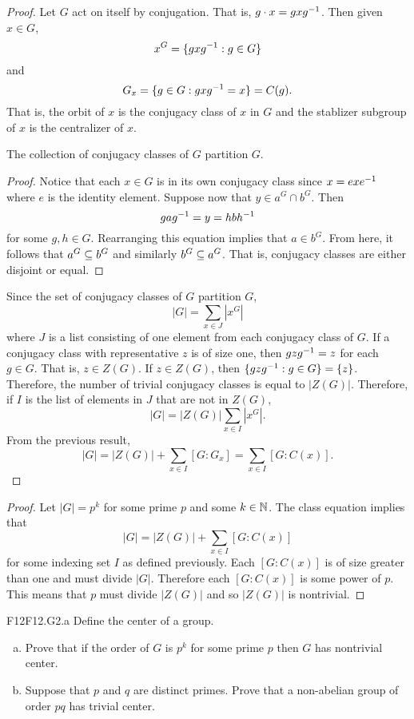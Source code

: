 \documentclass[../../AlgebraQualSolutions.tex]{subfiles}
\begin{document}
\begin{proof}
    Let $G$ act on itself by conjugation. That is, $g\cdot x = gxg^{-1}$. Then given $x \in G$,
        \[x^G = \{gxg^{-1}: g \in G\}\]
    and
        \[G_x = \{g \in G: gxg^{-1} = x\} = C(g).\]
    That is, the orbit of $x$ is the conjugacy class of $x$ in $G$ and the stablizer subgroup of $x$ is the centralizer of $x$.
    \begin{claim}
        The collection of conjugacy classes of $G$ partition $G$.

        \begin{proof}
            Notice that each $x \in G$ is in its own conjugacy class since $x = exe^{-1}$ where $e$ is the identity element. Suppose now that $y \in a^G \cap b^G$. Then
                \[gag^{-1} = y = hbh^{-1}\]
            for some $g,h \in G$. Rearranging this equation implies that $a \in b^G$. From here, it follows that $a^G \subseteq b^G$ and similarly $b^G \subseteq a^G$. That is, conjugacy classes are either disjoint or equal.
        \end{proof}
    \end{claim}

    Since the set of conjugacy classes of $G$ partition $G$,
        \[|G| = \sum_{x \in J} |x^G|\]
    where $J$ is a list consisting of one element from each conjugacy class of $G$. If a conjugacy class with representative $z$ is of size one, then
    $gzg^{-1} = z$ for each $g \in G$. That is, $z \in Z(G)$. If $z \in Z(G)$, then $\{gzg^{-1}: g \in G\} = \{z\}$. Therefore, the number of trivial conjugacy classes is equal to $|Z(G)|$. Therefore, if $I$ is the list of elements in $J$ that are not in $Z(G)$,
        \[|G| = |Z(G)| \sum_{x \in I} |x^G|.\]
    From the previous result,
        \[|G| = |Z(G)| + \sum_{x \in I} [G:G_x] = \sum_{x \in I}[G:C(x)].\]
\end{proof}

\begin{proof}
    Let $|G| = p^k$ for some prime $p$ and some $k \in \mathbb{N}$. The class equation implies that
        \[|G| = |Z(G)| + \sum_{x \in I}[G:C(x)]\]
    for some indexing set $I$ as defined previously. Each $[G:C(x)]$ is of size greater than one and must divide $|G|$. Therefore each $[G:C(x)]$ is some power of $p$. This means that $p$ must divide $|Z(G)|$ and so $|Z(G)|$ is nontrivial.
\end{proof}

\begin{prob}{F12}{F12.G2.a}
    Define the center of a group.
    \begin{enumerate}[(a)]
    \item Prove that if the order of $G$ is $p^k$ for some prime $p$ then $G$ has nontrivial center.
    \item Suppose that $p$ and $q$ are distinct primes. Prove that a non-abelian group of order $pq$ has trivial center.
    \end{enumerate}
    \end{prob}
    
\end{document}
